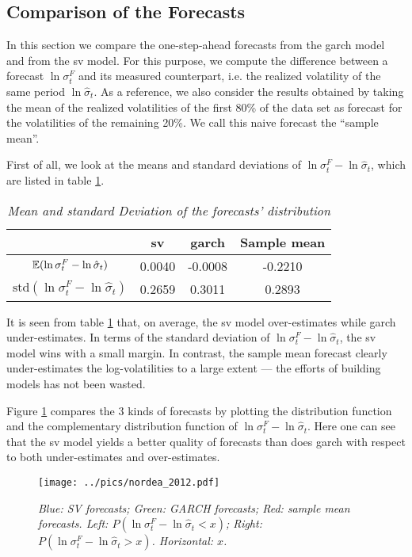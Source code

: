 \subsection{Comparison of the Forecasts}
In this section we compare the one-step-ahead forecasts from the \gls{garch}
model and from the \gls{sv} model. For this purpose, we
compute the difference between a forecast $\ln \sigma^F_t$ and its measured
counterpart, i.e. the realized volatility of the same period $\ln
\hat{\sigma}_t$. As a reference, we also consider the results obtained
by taking the mean of the realized volatilities of the first 80\% of
the data set as forecast for the volatilities of the remaining 20\%. We
call this naive forecast the ``sample mean''.

First of all, we look at the means and standard deviations of $\ln \sigma^F_t -
\ln \hat{\sigma}_t$, which are listed in table \ref{tab:nordea_2012}.
\begin{table}[htb!]
  \centering
  \begin{tabular}{|c|c|c|c|}
    \hline
    & \gls{sv} & \gls{garch} & Sample mean \\
    \hline
    $\mathbb{E}(\ln \sigma^F_t - \ln \hat{\sigma}_t)$ & 0.0040 & -0.0008 &
    -0.2210 \\
    \hline
    $\text{std}(\ln \sigma^F_t - \ln \hat{\sigma}_t)$ & 0.2659 & 0.3011 &
    0.2893 \\
    \hline
  \end{tabular}
  \caption{\small \it Mean and standard Deviation of the forecasts'
    distribution}
  \label{tab:nordea_2012}
\end{table}
It is seen from table \ref{tab:nordea_2012} that, on average, the \gls{sv}
model over-estimates while \gls{garch} under-estimates. In terms of the
standard deviation of $\ln \sigma^F_t - \ln \hat{\sigma}_t$, the \gls{sv}
model wins with a small margin. In contrast, the sample mean forecast
clearly under-estimates the log-volatilities to a large extent --- the
efforts of building models has not been wasted.

Figure \ref{fig:nordea_2012} compares the 3 kinds of forecasts by
plotting the distribution function and the complementary distribution
function of $\ln \sigma^F_t - \ln \hat{\sigma}_t$. Here one can see
that the \gls{sv} model yields a better quality of forecasts than does \gls{garch} 
with respect to both under-estimates and over-estimates.

\begin{figure}[htb!]
  \centering
    \texttt{[image: ../pics/nordea\_2012.pdf]}
  \caption{\small \it Blue: SV forecasts; Green: GARCH forecasts; Red:
    sample mean forecasts. Left: $P(\ln \sigma^F_t - \ln \hat{\sigma}_t < x)$;
    Right: $P(\ln \sigma^F_t - \ln \hat{\sigma}_t > x)$. Horizontal: $x$.}
  \label{fig:nordea_2012}
\end{figure}

